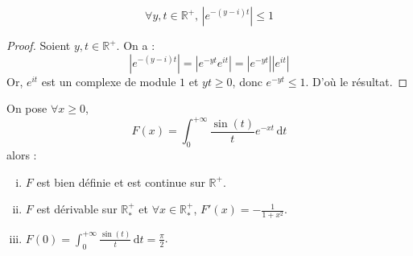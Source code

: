 




	\begin{lemma}
		\label{integrale-de-dirichlet-1}
		\[ \forall y, t \in \mathbb{R}^+, \, |e^{-(y-i)t}| \leq 1 \]
	\end{lemma}

	\begin{proof}
		Soient $y, t \in \mathbb{R}^+$. On a :
		\[ |e^{-(y-i)t}| = |e^{-yt} e^{it}| = |e^{-yt}| |e^{it}| \]
		Or, $e^{it}$ est un complexe de module $1$ et $yt \geq 0$, donc $e^{-yt} \leq 1$. D'où le résultat.
	\end{proof}


	\begin{theorem}
		On pose $\forall x \geq 0$,
		\[ F(x) = \int_0^{+\infty} \frac{\sin(t)}{t} e^{-xt} \, \mathrm{d}t \]
		alors :
		\begin{enumerate}[(i)]
			\item $F$ est bien définie et est continue sur $\mathbb{R}^+$.
			\item $F$ est dérivable sur $\mathbb{R}^+_*$ et $\forall x \in \mathbb{R}^+_*$, $F'(x) = -\frac{1}{1+x^2}$.
			\item $F(0) = \int_0^{+\infty} \frac{\sin(t)}{t} \, \mathrm{d}t = \frac{\pi}{2}$.
		\end{enumerate}
	\end{theorem}


